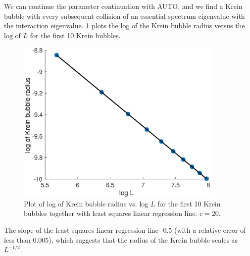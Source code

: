 \documentclass[thesis.tex]{subfiles}
\begin{document}
We can continue the parameter continuation with AUTO, and we find a Krein bubble with every subsequent collision of an essential spectrum eigenvalue with the interaction eigenvalue. \cref{fig:kreinbubbleradius} plots the log of the Krein bubble radius versus the log of $L$ for the first 10 Krein bubbles.

\begin{figure}
\includegraphics[width=10cm]{images/kdv5numerics/kreinbubbleradius}
\caption{Plot of log of Krein bubble radius vs. log $L$ for the first 10 Krein bubbles together with least squares linear regression line. $c = 20$.}
\label{fig:kreinbubbleradius}
\end{figure}

The slope of the least squares linear regression line -0.5 (with a relative error of less than 0.005), which suggests that the radius of the Krein bubble scales as $L^{-1/2}$.

\iffulldocument\else
	
	
\fi
\end{document}
